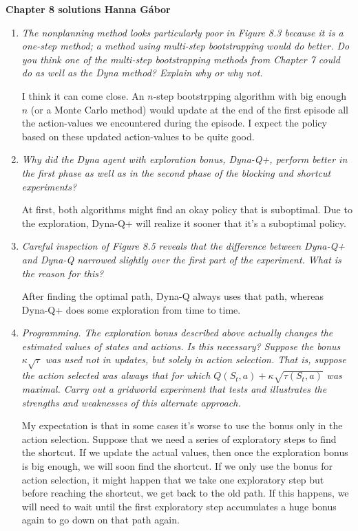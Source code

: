 \documentclass[12pt,a4paper]{article}
\begin{document}
\textbf{Chapter 8 solutions  \hfill Hanna Gábor}

\begin{enumerate}
  \item
    \textit{The nonplanning method looks particularly poor in Figure 8.3 because it is
    a one-step method; a method using multi-step bootstrapping would do better. Do you
    think one of the multi-step bootstrapping methods from Chapter 7 could do as well as
    the Dyna method? Explain why or why not.}

    I think it can come close. An $n$-step bootstrpping algorithm with big enough $n$ (or a
    Monte Carlo method) would update at the end of the first episode all the action-values we
    encountered during the episode.
    I expect the policy based on these updated action-values to be quite good.

  \item
    \textit{Why did the Dyna agent with exploration bonus, Dyna-Q+, perform
    better in the first phase as well as in the second phase of the blocking and shortcut
    experiments?}

    At first, both algorithms might find an okay policy that is suboptimal. Due
    to the exploration, Dyna-Q+ will realize it sooner that it's a suboptimal policy.

  \item
    \textit{Careful inspection of Figure 8.5 reveals that the difference between Dyna-Q+
    and Dyna-Q narrowed slightly over the first part of the experiment. What is the reason
    for this?}

    After finding the optimal path, Dyna-Q always uses that path, whereas Dyna-Q+
    does some exploration from time to time.

  \item
    \textit{Programming. The exploration bonus described above actually changes
    the estimated values of states and actions. Is this necessary? Suppose the bonus
    $\kappa \sqrt{\tau}$ was used not in updates, but solely in action selection.
    That is, suppose the action selected was always that for which $Q(S_t, a) +
    \kappa \sqrt{\tau (S_t, a)}$ was maximal. Carry out a gridworld experiment
    that tests and illustrates the strengths and weaknesses of this alternate approach.}

    My expectation is that in some cases it's worse to use the bonus only in the
    action selection. Suppose that we need a series of exploratory steps to find
    the shortcut. If we update the actual values, then once the exploration bonus
    is big enough, we will soon find the shortcut. If we only use the bonus for action
    selection, it might happen that we take one exploratory step but before reaching the
    shortcut, we get back to the old path. If this happens, we will need to wait until
    the first exploratory step accumulates a huge bonus again to go down on that
    path again.
\end{enumerate}
\end{document}
